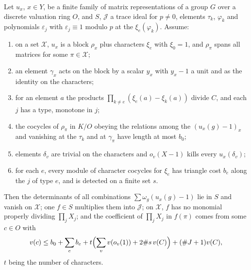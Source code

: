 \begin{theorem}\label{thm:ribet-lemma}
Let $u_x$, $x\in Y$, be a finite family of matrix representations of a group $G$ over a discrete valuation ring $O$, and $S$, $\mathcal J$ a trace ideal for $p\ne0$, elements $\tau_k$, $\varphi_k$ and polynomials $\varepsilon_j$ with
$\varepsilon_j\equiv1$ modulo $p$ at the $\xi_e(\varphi_k)$. Assume:
\begin{enumerate}[label=\textup{(\roman*)}]
\item on a set $\mathcal X$, $u_x$ is a block $\rho_x$ plus characters $\xi_e$ with $\xi_0=1$, and $\rho_\pi$ spans all matrices for some $\pi\in\mathcal X$;
\item an element $\gamma_x$ acts on the block by a scalar $y_x$ with $y_x-1$ a unit and as the identity on the characters;
\item for an element $a$ the products $\prod_{k\ne e}(\xi_e(a)-\xi_k(a))$ divide $C$, and each $j$ has a type, monotone in $j$;
\item the cocycles of $\rho_\pi$ in $K/O$ obeying the relations among the $(u_x(g)-1)_x$ and vanishing at the $\tau_k$ and at $\gamma_\pi$ have length at most $b_0$;
\item elements $\delta_v$ are trivial on the characters and $o_v(X-1)$ kills every $u_x(\delta_v)$;
\item for each $e$, every module of character cocycles for $\xi_e$ has triangle cost $b_e$ along the $j$ of type $e$, and is detected on a finite set $s$.
\end{enumerate}
Then the determinants of all combinations $\sum\omega_g(u_x(g)-1)$ lie in $S$ and vanish on $\mathcal X$; one $f\in S$ multiplies them into $\mathcal J$; on $\mathcal X$, $f$ has no monomial properly dividing $\prod_jX_j$; and the coefficient of
$\prod_jX_j$ in $f(\pi)$ comes from some $c\in O$ with
\[
  v(c)\le b_0+\sum_eb_e+t\Bigl(\sum_vv(o_v(1))+2\#s\,v(C)\Bigr)+(\#J+1)v(C),
\]
$t$ being the number of characters.
\end{theorem}

